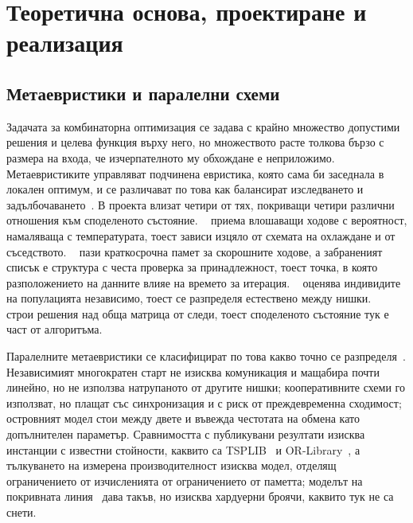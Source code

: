 \section{Теоретична основа, проектиране и реализация}
\label{sec:theory}

\subsection{Метаевристики и паралелни схеми}
\label{subsec:theory-background}

Задачата за комбинаторна оптимизация се задава с крайно множество допустими решения и целева функция
върху него, но множеството расте толкова бързо с размера на входа, че изчерпателното му обхождане е
неприложимо. Метаевристиките управляват подчинена евристика, която сама би заседнала в локален
оптимум, и се различават по това как балансират изследването и
задълбочаването~\cite{blum2003metaheuristics,talbi2009metaheuristics}. В проекта влизат четири от тях,
покриващи четири различни отношения към споделеното състояние.
~\cite{kirkpatrick1983annealing} приема влошаващи ходове с вероятност,
намаляваща с температурата, тоест зависи изцяло от схемата на охлаждане и от съседството.
~\cite{glover1986future} пази краткосрочна памет за скорошните ходове, а
забраненият списък е структура с честа проверка за принадлежност, тоест точка, в която разположението
на данните влияе на времето за итерация. ~\cite{holland1975adaptation}
оценява индивидите на популацията независимо, тоест се разпределя естествено между нишки.
~\cite{dorigo1996antsystem} строи решения над обща матрица от следи, тоест
споделеното състояние тук е част от алгоритъма.

Паралелните метаевристики се класифицират по това какво точно се
разпределя~\cite{crainic2010parallel,alba2005parallel}. Независимият многократен старт не изисква
комуникация и мащабира почти линейно, но не използва натрупаното от другите нишки; кооперативните
схеми го използват, но плащат със синхронизация и с риск от преждевременна сходимост; островният модел
стои между двете и въвежда честотата на обмена като допълнителен параметър. Сравнимостта с публикувани
резултати изисква инстанции с известни стойности, каквито са TSPLIB~\cite{reinelt1991tsplib} и
OR-Library~\cite{beasley1990orlibrary}, а тълкуването на измерена производителност изисква модел,
отделящ ограничението от изчисленията от ограничението от паметта; моделът на покривната
линия~\cite{williams2009roofline} дава такъв, но изисква хардуерни броячи, каквито тук не са снети.

